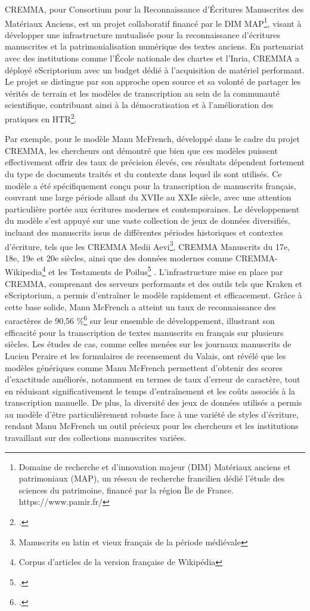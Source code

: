 \documentclass[a4paper,12pt,twoside]{book}
\begin{document}
	CREMMA, pour Consortium pour la Reconnaissance d’Écritures Manuscrites des Matériaux Anciens, est un projet collaboratif financé par le DIM MAP\footnote{Domaine de recherche et d’innovation majeur (DIM) Matériaux anciens et patrimoniaux (MAP), un réseau de recherche francilien dédié l’étude des sciences du patrimoine, financé par la région Île de France. https://www.pamir.fr/}, visant à développer une infrastructure mutualisée pour la reconnaissance d’écritures manuscrites et la patrimonialisation numérique des textes anciens. En partenariat avec des institutions comme l’École nationale des chartes et l’Inria, CREMMA a déployé eScriptorium avec un budget dédié à l’acquisition de matériel performant. Le projet se distingue par son approche open source et sa volonté de partager les vérités de terrain et les modèles de transcription au sein de la communauté scientifique, contribuant ainsi à la démocratisation et à l’amélioration des pratiques en HTR\footcite{chague_cremma_2021}.
	
	
	Par exemple, pour le modèle Manu McFrench, développé dans le cadre du projet CREMMA, les chercheurs ont démontré que bien que ces modèles puissent effectivement offrir des taux de précision élevés, ces résultats dépendent fortement du type de documents traités et du contexte dans lequel ils sont utilisés. Ce modèle a été spécifiquement conçu pour la transcription de manuscrits français, couvrant une large période allant du XVIIe au XXIe siècle, avec une attention particulière portée aux écritures modernes et contemporaines. Le développement du modèle s’est appuyé sur une vaste collection de jeux de données diversifiés, incluant des manuscrits issus de différentes périodes historiques et contextes d’écriture, tels que les CREMMA Medii Aevi\footnote{Manuscrits en latin et vieux français de la période médiévale}, CREMMA Manuscrits du 17e, 18e, 19e et 20e siècles, ainsi que des données modernes comme CREMMA-Wikipedia\footnote{Corpus d'articles de la version française de Wikipédia} et les Testaments de Poilus\footcite{chague_manu_2023} . L’infrastructure mise en place par CREMMA, comprenant des serveurs performants et des outils tels que Kraken et eScriptorium, a permis d’entraîner le modèle rapidement et efficacement. Grâce à cette base solide, Manu McFrench a atteint un taux de reconnaissance des caractères de 90,56 \%\footcite{chague_manu_2023} sur leur ensemble de développement, illustrant son efficacité pour la transcription de textes manuscrits en français sur plusieurs siècles. Les études de cas, comme celles menées sur les journaux manuscrits de Lucien Peraire et les formulaires de recensement du Valais, ont révélé que les modèles génériques comme Manu McFrench permettent d’obtenir des scores d’exactitude améliorés, notamment en termes de taux d’erreur de caractère, tout en réduisant significativement le temps d’entraînement et les coûts associés à la transcription manuelle. De plus, la diversité des jeux de données utilisés a permis au modèle d’être particulièrement robuste face à une variété de styles d’écriture, rendant Manu McFrench un outil précieux pour les chercheurs et les institutions travaillant sur des collections manuscrites variées.
	
\end{document}

